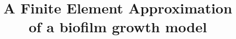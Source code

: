 \documentclass[12pt,twoside,table]{book}
\begin{document}
\title{A Finite Element Approximation of a biofilm growth model}

%
%


\renewcommand\partname{Part}
\renewcommand\chaptername{Chapter}
\renewcommand\contentsname{Contents}
\renewcommand\listfigurename{List of Figures}
\renewcommand\listtablename{List of Tables}
\renewcommand\indexname{Index}
\renewcommand{\figurename}{Figure}
\renewcommand{\tablename}{Table}
\renewcommand*{\proofname}{Proof}





\pagestyle{empty} %
\frontmatter


\cleardoublepage


\cleardoublepage


\cleardoublepage


\cleardoublepage %

\pagestyle{fancy} %

\begingroup %

\mainmatter %


\setlength\abovedisplayskip{-5pt}
\setlength\belowdisplayskip{\parskip}
\setlength\abovedisplayshortskip{-5pt}
\setlength\belowdisplayshortskip{\parskip}
\end{document}
